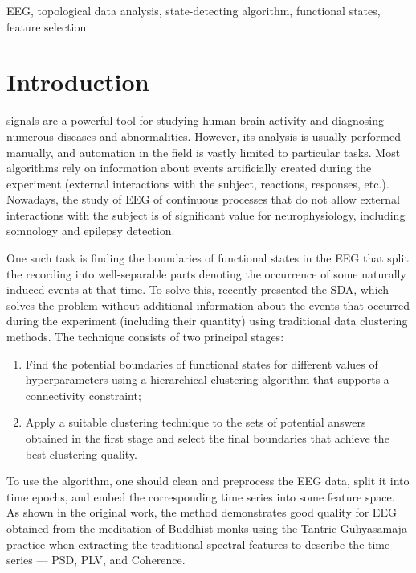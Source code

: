 \documentclass[10pt,lettersize,journal]{IEEEtran}
\begin{document}
\begin{IEEEkeywords}
EEG, topological data analysis, state-detecting algorithm, functional states, feature selection
\end{IEEEkeywords}

\section{Introduction}

 signals are a powerful tool for studying human brain activity and diagnosing numerous diseases and abnormalities. However, its analysis is usually performed manually, and automation in the field is vastly limited to particular tasks. Most algorithms rely on information about events artificially created during the experiment (external interactions with the subject, reactions, responses, etc.). Nowadays, the study of EEG of continuous processes that do not allow external interactions with the subject is of significant value for neurophysiology, including somnology and epilepsy detection.

One such task is finding the boundaries of functional states in the EEG that split the recording into well-separable parts denoting the occurrence of some naturally induced events at that time. To solve this, \cite{SDA} recently presented the SDA, which solves the problem without additional information about the events that occurred during the experiment (including their quantity) using traditional data clustering methods. The technique consists of two principal stages:

\begin{enumerate}
    \item
        Find the potential boundaries of functional states for different values of hyperparameters using a hierarchical clustering algorithm that supports a connectivity constraint;
    \item
        Apply a suitable clustering technique to the sets of potential answers obtained in the first stage and select the final boundaries that achieve the best clustering quality.
\end{enumerate}

To use the algorithm, one should clean and preprocess the EEG data, split it into time epochs, and embed the corresponding time series into some feature space. As shown in the original work, the method demonstrates good quality for EEG obtained from the meditation of Buddhist monks using the Tantric Guhyasamaja practice when extracting the traditional spectral features to describe the time series --- PSD, PLV, and Coherence.
\end{document}
